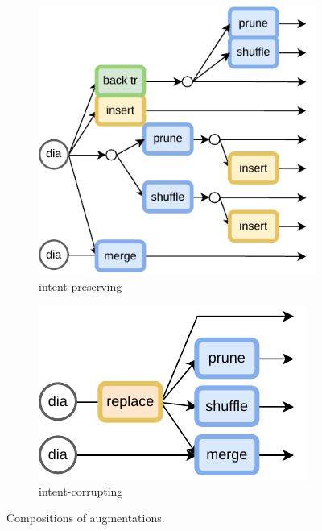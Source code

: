 \documentclass{article}
\begin{document}
\begin{figure}[!htb]
    \centering
    \begin{subfigure}[t]{0.5\linewidth}
        \includegraphics[width=0.85\linewidth]{figures/augmentation-pipeline-positive.drawio.pdf}
        \caption{intent-preserving}
        \centering
    \end{subfigure}
    \begin{subfigure}[t]{0.35\linewidth}
        \includegraphics[width=0.9\linewidth]{figures/augmentation-pipeline-negative.drawio.pdf}
        \caption{intent-corrupting}
        \centering
    \end{subfigure}
    \caption{Compositions of augmentations.}
    \label{fig:aug-compositions}
\end{figure}
\end{document}
